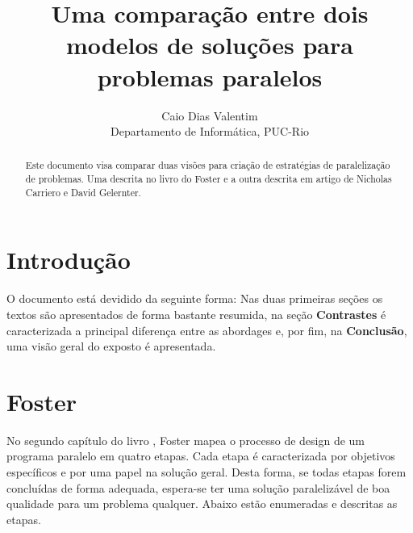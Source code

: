 \documentclass[12pt]{article}
\begin{document}
\nocite{*}

\title{Uma comparação entre dois modelos de soluções para problemas paralelos}

\author{Caio Dias Valentim \\ 
Departamento de Informática, 
PUC-Rio
}

\maketitle

\begin{abstract}
	Este documento visa comparar duas visões para criação de estratégias de paralelização
	de problemas. Uma descrita no livro do Foster e a outra descrita
	em artigo de Nicholas Carriero e David Gelernter.
\end{abstract}

\section{Introdução}

O documento está devidido da seguinte forma: Nas duas primeiras seções os textos são
apresentados de forma bastante resumida, na seção \textbf{Contrastes} é caracterizada a principal
diferença entre as abordages e, por fim, na \textbf{Conclusão}, uma visão geral do exposto é apresentada.

\section{Foster}

No segundo capítulo do livro \cite{foster}, Foster mapea
o processo de design de um programa paralelo em quatro etapas. Cada 
etapa é caracterizada por objetivos específicos e por uma papel na solução geral.
Desta forma, se todas etapas forem concluídas de forma adequada, espera-se ter uma solução paralelizável de boa 
qualidade para um problema qualquer. Abaixo estão enumeradas e descritas as etapas.
\end{document}
